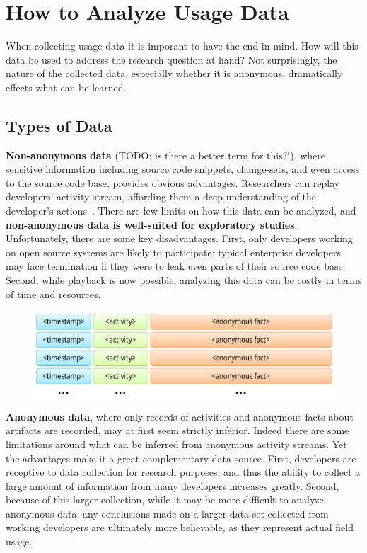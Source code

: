 \section{How to Analyze Usage Data}

When collecting usage data it is imporant to have the end in mind. How will this data be used to address the research question at hand? Not surprisingly, the nature of the collected data, especially whether it is anonymous, dramatically effects what can be learned.


\subsection{Types of Data}

\noindent
{\bf Non-anonymous data} (TODO: is there a better term for this?!), where sensitive information including source code snippets, change-sets, and even access to the source code base, provides obvious advantages. Researchers can replay developers' activity stream, affording them a deep understanding of the developer's actions~\cite{UseDisuseMisuseRefactoringsExtendedVersion}. There are few limits on how this data can be analyzed, and {\bf non-anonymous data is well-suited for exploratory studies}. Unfortunately, there are some key disadvantages. First, only developers working on open source systems are likely to participate; typical enterprise developers may face termination if they were to leak even parts of their source code base. Second, while playback is now possible, analyzing this data can be costly in terms of time and resources. 

\vspace{0.1in}

\begin{figure}[t]
 \centering
\includegraphics[width=1\columnwidth]{Graphics/activityLogTheoretical.pdf}
\label{fig:theoretical}
\end{figure}

\noindent
{\bf Anonymous data}, where only records of activities and anonymous facts about artifacts are recorded, may at first seem strictly inferior. Indeed there are some limitations around what can be inferred from anonymous activity streams. Yet the advantages make it a great complementary data source. First, developers are receptive to data collection for research purposes, and thus the ability to collect a large amount of information from many developers increases greatly. Second, because of this larger collection, while it may be more difficult to analyze anonymous data, any conclusions made on a larger data set collected from working developers are ultimately more believable, as they represent actual field usage. 

